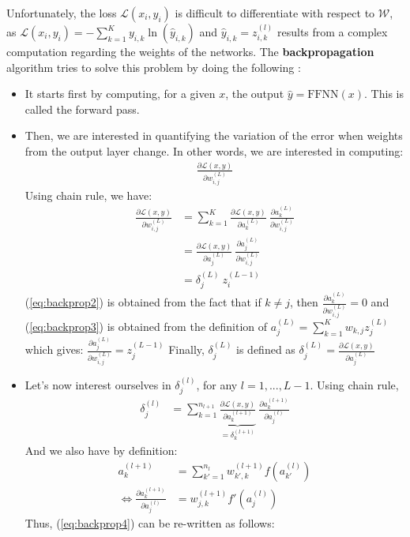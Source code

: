 \documentclass{article}
\begin{document}
\noindent Unfortunately, the loss $\mathcal{L}(x_i, y_i)$ is difficult to differentiate with respect to 
$\mathcal{W}$, as  $\mathcal{L}(x_i, y_i) = -\sum_{k=1}^K y_{i,k}\ln (\hat{y}_{i, k})$ and $\hat{y}_{i, k} = z_{i, k}^{(l)}$ 
results from a complex computation regarding the weights of the networks. The \textbf{backpropagation}
algorithm tries to solve this problem by doing the following : 
\begin{itemize}
    \item It starts first by computing, for a given $x$, the output $\hat{y} = \text{FFNN}(x)$. This is called the forward pass. 
    \item Then, we are interested in quantifying the variation of the error when weights from the output layer 
    change. In other words, we are interested in computing:
    \begin{align*}
        \frac{\partial \mathcal{L}(x, y)}
        {\partial w_{i, j}^{(L)}}
    \end{align*}
    Using chain rule, we have:
    \begin{align}
        \frac{\partial \mathcal{L}(x, y)}
        {\partial w_{i, j}^{(L)}} &= \sum_{k=1}^K
        \frac{\partial \mathcal{L}(x, y)}
        {\partial a_k^{(L)}} \
        \frac{\partial a_k^{(L)}}{\partial w_{i, j}^{(L)}} \label{eq:backprop1}\\
        &= 
        \frac{\partial \mathcal{L}(x, y)}
        {\partial a_j^{(L)}} \
        \frac{\partial a_j^{(L)}}{\partial w_{i, j}^{(L)}} \label{eq:backprop2}\\
        &= \delta_j^{(L)} \
          z_i^{(L-1)} \label{eq:backprop3}
    \end{align}
    (\ref{eq:backprop2}) is obtained from the fact that if $k\neq j$, then $ \frac{\partial a_k^{(L)}}{\partial w_{i, j}^{(L)}} = 0$
    and (\ref{eq:backprop3}) is obtained from  the definition of $a_j^{(L)} = \sum_{k=1}^{K} w_{k, j} z_{j}^{(L)}$ which gives: 
    $\frac{\partial a_j^{(L)}}{\partial w_{i, j}^{(L)}} = z_j^{(L-1)}$ 
    Finally, $\delta_j^{(L)}$ is defined as $\delta_j^{(L)} = \frac{\partial \mathcal{L}(x, y)}
    {\partial a_j^{(L)}}$ 
     
    
     \item Let's now interest ourselves in $\delta_j^{(l)}$, for any $l=1, ..., L-1$. Using chain rule, 
     \begin{align}
        \delta_j^{(l)} &= \sum_{k=1}^{n_{l+1}}
        \underset{= \delta_k^{(l+1)}}{
        \underbrace{
        \frac{\partial \mathcal{L}(x, y)}{\partial a_k^{(l+1)}}}} \
        \frac{\partial a_k^{(l+1)}}{\partial a_j^{(l)}}  \label{eq:backprop4}
     \end{align}
     And we also have by definition: 
     \begin{align}
         a_k^{(l+1)} &= \sum_{k'=1}^{n_{l}}  w_{k', k}^{(l+1)} f(a_{k'}^{(l)}) \\
         \Leftrightarrow \frac{\partial a_k^{(l+1)}}{\partial a_j^{(l)}} &= 
         w_{j, k}^{(l+1)} f'(a_j^{(l)})
     \end{align}
     Thus, (\ref{eq:backprop4}) can be re-written as follows:


\end{itemize}
\end{document}
